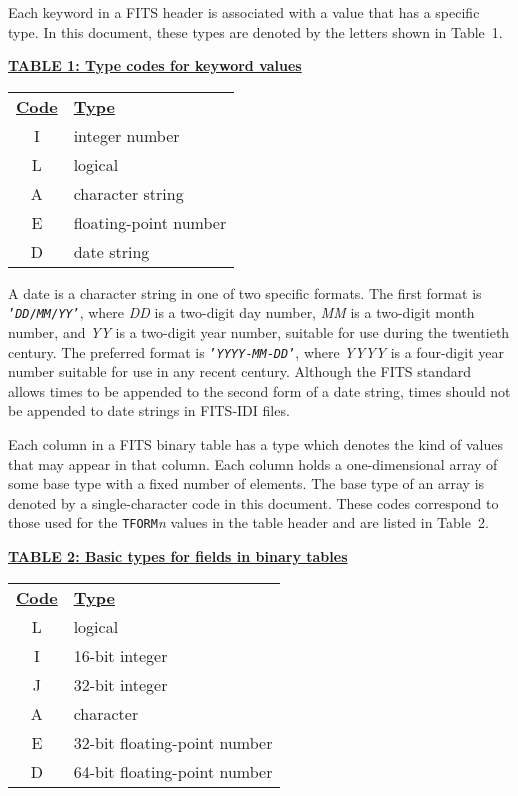 \documentclass[twoside]{article}
\newcommand{\Hi}[1]{\textcolor{hicol}{#1}}
\begin{document}
Each keyword in a FITS header is associated with a value that has a
specific type.  In this document, these types are denoted by the
letters shown in Table~1.

\vfill\eject
\begin{center}
\underline{\bf{TABLE 1: Type codes for keyword values}}\\
\begin{tabular}{cl}
\noalign{\vspace{2pt}}
\underline{{\bf Code\vphantom{y}}} & \underline{\bf{Type}} \\
\noalign{\vspace{2pt}}
 I & integer number \\
 L & logical \\
 A & character string \\
 E & floating-point number \\
 D & date string
\end{tabular}
\end{center}

A date is a character string in one of two specific formats.  The
first format is \hbox{\tt{'{\it DD\/}/{\it MM\/}/{\it YY\/}'}}, where
{\it DD} is a two-digit day number, {\it MM} is a two-digit month
number, and {\it YY} is a two-digit year number, \Hi{suitable for use
during the twentieth century.  The preferred format} is
\hbox{\tt{'{\it YYYY\/}-{\it MM\/}-{\it DD\/}'}}, where {\it YYYY} is
a four-digit year number \Hi{suitable for use in any recent century}.
Although the FITS standard allows times to be appended to the second
form of a date string, times should not be appended to date strings in
FITS-IDI files.

Each column in a FITS binary table has a type which denotes the
\Hi{kind} of values that may appear in that column.  Each column holds
a one-dimensional array of some base type with a fixed number of
elements.  The base type of an array is denoted by a single-character
code in this document.  These codes correspond to those used for the
{\tt TFORM}{\it n} values in the table header and are listed in
Table~2.

\begin{center}
\underline{\bf{TABLE 2: Basic types for fields in binary tables}}\\
\begin{tabular}{cl}
\noalign{\vspace{2pt}}
\underline{{\bf Code\vphantom{y}}} & \underline{\bf{Type}} \\
\noalign{\vspace{2pt}}
 L & logical \\
 I & 16-bit integer \\
 J & 32-bit integer \\
 A & character \\
 E & 32-bit floating-point number \\
 D & 64-bit floating-point number
\end{tabular}
\end{center}
\end{document}
